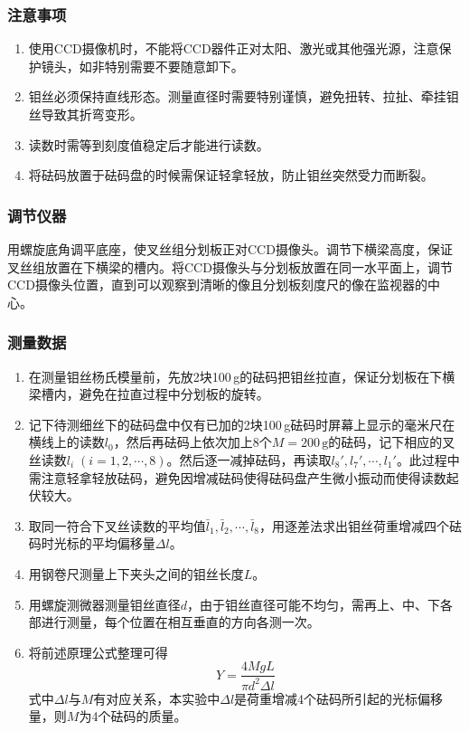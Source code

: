 \documentclass[zihao=5, UTF8]{article}
\theoremstyle{MyLineTheoremStyle} %
\theoremstyle{MyBlockTheoremStyle} %
\theoremstyle{MySubsubsectionStyle} %
\begin{document}
\subsubsection{注意事项}

\begin{enumerate}
    \item 使用CCD摄像机时，不能将CCD器件正对太阳、激光或其他强光源，注意保护镜头，如非特别需要不要随意卸下。
    \item 钼丝必须保持直线形态。测量直径时需要特别谨慎，避免扭转、拉扯、牵挂钼丝导致其折弯变形。
    \item 读数时需等到刻度值稳定后才能进行读数。
    \item 将砝码放置于砝码盘的时候需保证轻拿轻放，防止钼丝突然受力而断裂。
\end{enumerate}

\subsubsection{调节仪器}
用螺旋底角调平底座，使叉丝组分划板正对CCD摄像头。调节下横梁高度，保证叉丝组放置在下横梁的槽内。将CCD摄像头与分划板放置在同一水平面上，调节CCD摄像头位置，直到可以观察到清晰的像且分划板刻度尺的像在监视器的中心。

\subsubsection{测量数据}

\begin{enumerate}
    \item 在测量钼丝杨氏模量前，先放2块100\,g的砝码把钼丝拉直，保证分划板在下横梁槽内，避免在拉直过程中分划板的旋转。
    \item 记下待测细丝下的砝码盘中仅有已加的2块100\,g砝码时屏幕上显示的毫米尺在横线上的读数$ l_0 $，然后再砝码上依次加上8个$ M=200\,\mathrm{g} $的砝码，记下相应的叉丝读数$ l_i\;(i=1,2,\cdots,8) $。然后逐一减掉砝码，再读取$ l_8',l_7',\cdots,l_1' $。此过程中需注意轻拿轻放砝码，避免因增减砝码使得砝码盘产生微小振动而使得读数起伏较大。
    \item 取同一符合下叉丝读数的平均值$ \bar l_1,\bar l_2,\cdots,\bar l_8 $，用逐差法求出钼丝荷重增减四个砝码时光标的平均偏移量$ \Delta l $。
    \item 用钢卷尺测量上下夹头之间的钼丝长度$ L $。
    \item 用螺旋测微器测量钼丝直径$ d $，由于钼丝直径可能不均匀，需再上、中、下各部进行测量，每个位置在相互垂直的方向各测一次。
    \item 将前述原理公式整理可得
	\begin{equation}\label{1-Yang}
		Y=\frac{4MgL}{\pi d^2\Delta l}
	\end{equation}
	式中$ \Delta l $与$ M $有对应关系，本实验中$ \Delta l $是荷重增减4个砝码所引起的光标偏移量，则$ M $为4个砝码的质量。
\end{enumerate}
\end{document}
